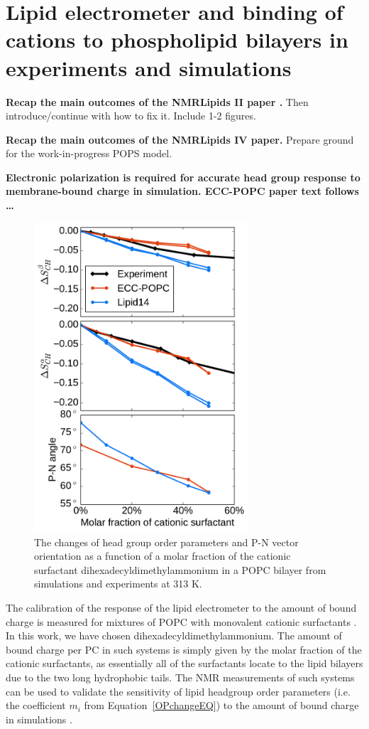 \section{Lipid electrometer and binding of cations to phospholipid bilayers in experiments and simulations}
\label{section:electrometer_exp_sim} 

\textbf{ Recap the main outcomes of the NMRLipids II paper \citep{catte16}. }
Then introduce/continue with how to fix it. 
Include 1-2 figures. 

\textbf{ Recap the main outcomes of the NMRLipids IV paper. }
Prepare ground for the work-in-progress POPS model. 

\textbf{Electronic polarization is required for accurate head group response to membrane-bound charge in simulation. ECC-POPC paper text follows \dots  }

\begin{figure}[tb!] 
  \centering 
  \includegraphics[width=8.0cm]{../img/ecc_popc/PN_angle_OrdPars-A-B_L14-ECCL17_q80_sig89_surf.pdf} 
  \caption{\label{OrderParameterCHANGESsurf} 
    The changes of head group order parameters and P-N vector orientation as a function of 
    a molar fraction of the cationic surfactant dihexadecyldimethylammonium in a POPC bilayer 
    from simulations and experiments \citep{scherer89} at 313 K.
  } 
\end{figure} 
 
The calibration of the response of the lipid electrometer to the amount of bound charge 
is measured for mixtures of POPC with monovalent cationic surfactants \citep{scherer89}.
In this work, we have chosen dihexadecyldimethylammonium. 
The amount of bound charge per PC 
in such systems is simply given by the molar fraction of the cationic surfactants, 
as essentially all of the surfactants locate to the lipid bilayers 
due to the two long hydrophobic tails.
The NMR measurements of such systems  
can be used to validate the sensitivity of lipid headgroup order parameters 
(i.e. the coefficient $m_i$ from Equation~\ref{OPchangeEQ}) 
to the amount of bound charge in simulations \citep{scherer89}.


